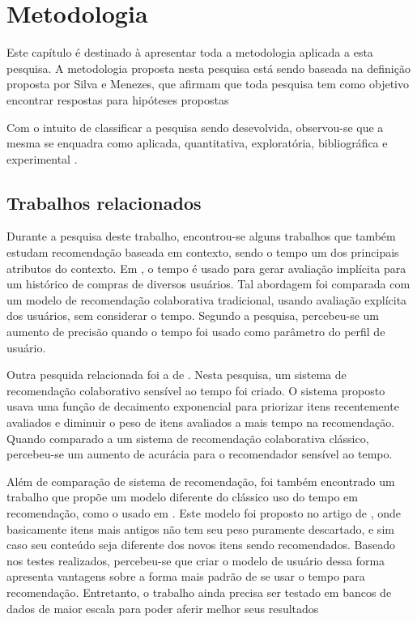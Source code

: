 \chapter[Metodologia]{Metodologia}

Este capítulo é destinado à apresentar toda a metodologia aplicada a esta
pesquisa. A metodologia proposta nesta pesquisa está sendo
baseada na definição proposta por Silva e Menezes, que afirmam que toda pesquisa
tem como objetivo encontrar respostas para hipóteses propostas
\cite{da2005metodologia}

Com o intuito de classificar a pesquisa sendo desevolvida, observou-se que a
mesma se enquadra como aplicada, quantitativa, exploratória, bibliográfica e
experimental \cite{da2005metodologia}.


\section{Trabalhos relacionados}

Durante a pesquisa deste trabalho, encontrou-se alguns trabalhos que também estudam recomendação baseada em contexto, sendo o tempo um dos
principais atributos do contexto. Em \cite{lee2008time}, o tempo é usado para gerar avaliação implícita para um histórico de
compras de diversos usuários. Tal abordagem foi comparada com um modelo de recomendação colaborativa tradicional, usando avaliação explícita dos usuários,
sem considerar o tempo. Segundo a pesquisa, percebeu-se um aumento de precisão
quando o tempo foi usado como parâmetro do perfil de usuário.

Outra pesquida relacionada foi a de \cite{ding2005time}. Nesta pesquisa, um
sistema de recomendação colaborativo sensível ao tempo foi criado. O sistema proposto usava uma função de
decaimento exponencial para priorizar itens recentemente avaliados e diminuir o peso de itens avaliados a mais tempo na recomendação. Quando comparado a um sistema de
recomendação colaborativa clássico, percebeu-se um aumento de acurácia para o recomendador sensível ao tempo.

Além de comparação de sistema de recomendação, foi também encontrado um trabalho que propõe um modelo diferente do clássico uso do tempo em recomendação, como o usado em
\cite{ding2005time}. Este modelo foi proposto no artigo de \cite{basile2015modeling}, onde basicamente itens mais antigos não tem seu peso puramente descartado, e sim caso
seu conteúdo seja diferente dos novos itens sendo recomendados. Baseado nos
testes realizados, percebeu-se que criar o modelo de usuário dessa forma apresenta vantagens sobre
a forma mais padrão de se usar o tempo para recomendação. Entretanto, o trabalho ainda precisa ser testado em bancos de dados de maior escala para poder aferir melhor
seus resultados

